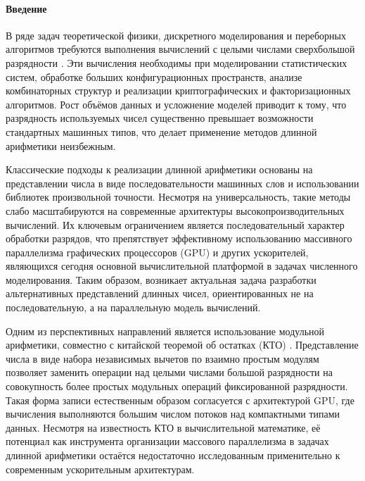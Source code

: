 \documentclass{crm-article}
\begin{document}
\paragraph{Введение}

В ряде задач теоретической физики, дискретного моделирования и переборных алгоритмов требуются выполнения вычислений с целыми числами сверхбольшой разрядности \cite{hao2022cambricon, makarova2023canonical, trukhin2024thermodynamic, trukhin2025low, Vasiliev2020Numerical}. Эти вычисления необходимы при моделировании статистических систем, обработке больших конфигурационных пространств, анализе комбинаторных структур и реализации криптографических и факторизационных алгоритмов. Рост объёмов данных и усложнение моделей приводит к тому, что разрядность используемых чисел существенно превышает возможности стандартных машинных типов, что делает применение методов длинной арифметики неизбежным.

Классические подходы к реализации длинной арифметики основаны на представлении числа в виде последовательности машинных слов и использовании библиотек произвольной точности. Несмотря на универсальность, такие методы слабо масштабируются на современные архитектуры высокопроизводительных вычислений. Их ключевым ограничением является последовательный характер обработки разрядов, что препятствует эффективному использованию массивного параллелизма графических процессоров (GPU) и других ускорителей, являющихся сегодня основной вычислительной платформой в задачах численного моделирования. Таким образом, возникает актуальная задача разработки альтернативных представлений длинных чисел, ориентированных не на последовательную, а на параллельную модель вычислений.

Одним из перспективных направлений является использование модульной арифметики, совместно с китайской теоремой об остатках (КТО)  \cite{Okulov2011, Cormen2001}. Представление числа в виде набора независимых вычетов по взаимно простым модулям позволяет заменить операции над целыми числами большой разрядности на совокупность более простых модульных операций фиксированной разрядности. Такая форма записи естественным образом согласуется с архитектурой GPU, где вычисления выполняются большим числом потоков над компактными типами данных. Несмотря на известность КТО в вычислительной математике, её потенциал как инструмента организации массового параллелизма в задачах длинной арифметики остаётся недостаточно исследованным применительно к современным ускорительным архитектурам.
\end{document}
